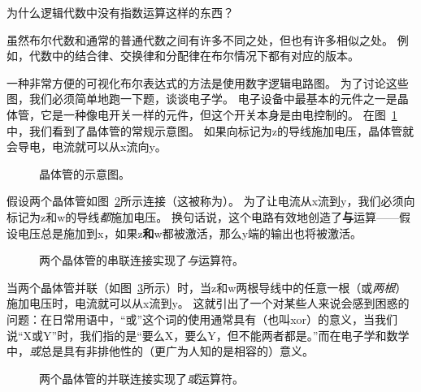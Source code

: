 \begin{exer} 
为什么逻辑代数中没有指数运算这样的东西？
\end{exer}

虽然布尔代数和通常的普通代数之间有许多不同之处，但也有许多相似之处。
例如，代数中的结合律、交换律和分配律在布尔情况下都有对应的版本。

一种非常方便的可视化布尔表达式的方法是使用数字逻辑电路图。
为了讨论这些图，我们必须简单地跑一下题，谈谈电子学。
电子设备中最基本的元件之一是晶体管，它是一种像电开关一样的元件，但这个开关本身是由电控制的。
在图~\ref{fig:trans}中，我们看到了晶体管的常规示意图。
如果向标记为z的导线施加电压，晶体管就会导电，电流就可以从x流向y。

\begin{figure}[!hbtp] 
\begin{center}

\end{center}
\caption{晶体管的示意图。}
\label{fig:trans}
\end{figure}

假设两个晶体管如图~\ref{fig:series}所示连接（这被称为）。
为了让电流从x流到y，我们必须向标记为z和w的导线{\em 都}施加电压。
换句话说，这个电路有效地创造了{\bf 与}运算——假设电压总是施加到x，如果z{\bf 和}w都被激活，那么y端的输出也将被激活。

\begin{figure}[!hbtp] 
\begin{center}

\end{center}
\caption[串联连接实现了{\em 与}。]{两个晶体管的串联连接实现了{\em 与}运算符。}
\label{fig:series}
\end{figure}

当两个晶体管并联（如图~\ref{fig:par}所示）时，当z和w两根导线中的任意一根（或{\em 两根}）施加电压时，电流就可以从x流到y。
这就引出了一个对某些人来说会感到困惑的问题：在日常用语中，“或”这个词的使用通常具有（也叫xor）的意义，当我们说“X或Y”时，我们指的是“要么X，要么Y，但不能两者都是。”而在电子学和数学中，{\em 或}总是具有非排他性的（更广为人知的是相容的）意义。

\begin{figure}[!hbtp] 
\begin{center}

\end{center}
\caption[并联连接实现了{\em 或}]{两个晶体管的并联连接实现了{\em 或}运算符。}
\label{fig:par}
\end{figure}

